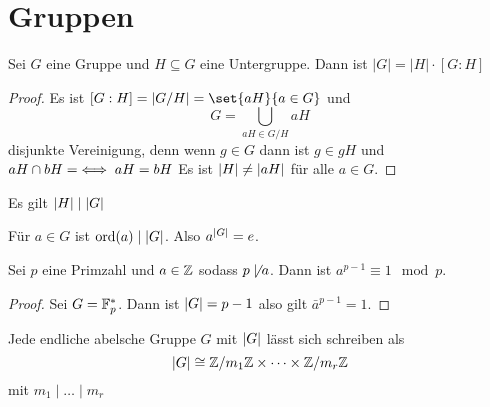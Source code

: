 \section{Gruppen}
\begin{Satz}[Gruppenordnung]
    Sei $G$ eine Gruppe und $H\subseteq G$ eine Untergruppe. Dann ist $|G|=|H|\cdot [G:H]$
\end{Satz}
\begin{proof}
    Es ist $[G:H]=\abs{G/H}=\set{aH}{a\in G}$ und $$G=\bigcup_{aH\in G/H}aH$$ disjunkte Vereinigung, denn wenn $g\in G$ dann ist $g\in gH$ und $aH\cap bH=\empty \iff aH=bH$ Es ist $\lvert H\rvert\not=\lvert aH\rvert$ für alle $a\in G$.
\end{proof}
\begin{Kor}\label{Kor:Lagrange}
    Es gilt $\lvert H\rvert\mid\lvert G\rvert$
\end{Kor}
\begin{Kor}\label{Kor:Lagrange2}
Für $a\in G$ ist $\operatorname{ord}(a)\mid \lvert G\rvert$. Also $a^{\lvert G\rvert}=e$.
\end{Kor}
\begin{Kor}\label{Kleiner Satz von Fermat}
    Sei $p$ eine Primzahl und $a\in\mathbb{Z}$ sodass $p\not\mid a$. Dann ist $a^{p-1}\equiv 1\mod p$.
\end{Kor}
\begin{proof}
    Sei $G=\mathbb{F}_p^*$. Dann ist $\lvert G\rvert=p-1$ also gilt $\bar a^{p-1}=1$.
\end{proof}
\begin{Satz} \label{Satz:StuktEndlAb}
Jede endliche abelsche Gruppe $G$ mit $\lvert G\rvert$ lässt sich schreiben als 
$$\lvert G\rvert\cong \mathbb{Z}/m_1\mathbb{Z}\times\dots\times\mathbb{Z}/m_r\mathbb{Z}$$ mit $m_1\mid\dots\mid m_r$
\end{Satz}
